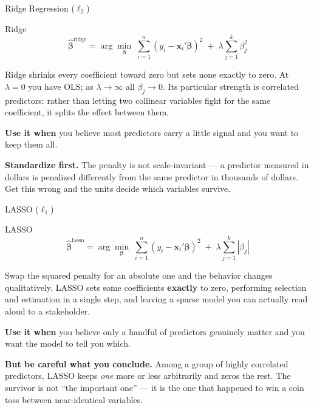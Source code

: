 \documentclass[aspectratio=169, 11pt]{beamer}
\begin{document}
\begin{frame}{Ridge Regression ($\ell_2$)}
  \begin{definitionbox}{Ridge \parencite{HoerlKennard1970}}
    \[
      \hat{\boldsymbol{\beta}}^{\text{ridge}}
      = \arg\min_{\boldsymbol{\beta}} \;
        \sum_{i=1}^{n}(y_i - \mathbf{x}_i'\boldsymbol{\beta})^2
        \; + \; \lambda \sum_{j=1}^{k} \beta_j^2
    \]
  \end{definitionbox}
  Ridge shrinks every coefficient toward zero but sets none exactly to zero. At $\lambda = 0$
  you have OLS; as $\lambda \to \infty$ all $\beta_j \to 0$. Its particular strength is
  correlated predictors: rather than letting two collinear variables fight for the same
  coefficient, it splits the effect between them.

  \vspace{0.15cm}
  \textbf{Use it when} you believe most predictors carry a little signal and you want to keep
  them all.

  \vspace{0.15cm}
  \textbf{Standardize first.} The penalty is not scale-invariant --- a predictor measured in
  dollars is penalized differently from the same predictor in thousands of dollars. Get this
  wrong and the units decide which variables survive.
\end{frame}

\begin{frame}{LASSO ($\ell_1$)}
  \begin{definitionbox}{LASSO \parencite{Tibshirani1996}}
    \[
      \hat{\boldsymbol{\beta}}^{\text{lasso}}
      = \arg\min_{\boldsymbol{\beta}} \;
        \sum_{i=1}^{n}(y_i - \mathbf{x}_i'\boldsymbol{\beta})^2
        \; + \; \lambda \sum_{j=1}^{k} |\beta_j|
    \]
  \end{definitionbox}
  Swap the squared penalty for an absolute one and the behavior changes qualitatively. LASSO
  sets some coefficients \textbf{exactly} to zero, performing selection and estimation in a
  single step, and leaving a sparse model you can actually read aloud to a stakeholder.

  \vspace{0.15cm}
  \textbf{Use it when} you believe only a handful of predictors genuinely matter and you want
  the model to tell you which.

  \vspace{0.15cm}
  \textbf{But be careful what you conclude.} Among a group of highly correlated predictors,
  LASSO keeps \emph{one} more or less arbitrarily and zeros the rest. The survivor is not
  ``the important one'' --- it is the one that happened to win a coin toss between
  near-identical variables.
\end{frame}
\end{document}
